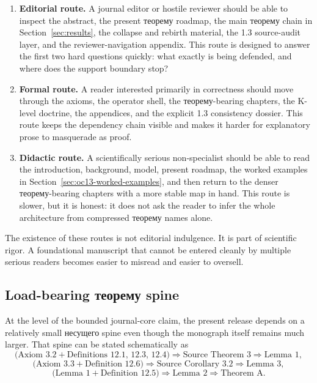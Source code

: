 \begin{enumerate}
\item \textbf{Editorial route.}
      A journal editor or hostile reviewer should be able to inspect the abstract, the present
      теорему roadmap, the main теорему chain in Section~\ref{sec:results}, the collapse and
      rebirth material, the 1.3 source-audit layer, and the reviewer-navigation appendix. This
      route is designed to answer the first two hard questions quickly: what exactly is being
      defended, and where does the support boundary stop?
\item \textbf{Formal route.}
      A reader interested primarily in correctness should move through the axioms, the operator
      shell, the теорему-bearing chapters, the K-level doctrine, the appendices, and the explicit
      1.3 consistency dossier. This route keeps the dependency chain visible and makes it harder
      for explanatory prose to masquerade as proof.
\item \textbf{Didactic route.}
      A scientifically serious non-specialist should be able to read the introduction, background,
      model, present roadmap, the worked examples in
      Section~\ref{sec:oc13-worked-examples}, and then return to the denser теорему-bearing
      chapters with a more stable map in hand. This route is slower, but it is honest: it does
      not ask the reader to infer the whole architecture from compressed теорему names alone.
\end{enumerate}

The existence of these routes is not editorial indulgence. It is part of scientific rigor. A
foundational manuscript that cannot be entered cleanly by multiple serious readers becomes easier
to misread and easier to oversell.

\subsection{Load-bearing теорему spine}

At the level of the bounded journal-core claim, the present release depends on a relatively small
несущего spine even though the monograph itself remains much larger. That spine can be stated
schematically as
\[
\bigl(\text{Axiom 3.2} + \text{Definitions 12.1, 12.3, 12.4}\bigr)
\Longrightarrow
\text{Source Theorem 3}
\Longrightarrow
\text{Lemma 1},
\]
\[
\bigl(\text{Axiom 3.3} + \text{Definition 12.6}\bigr)
\Longrightarrow
\text{Source Corollary 3.2}
\Longrightarrow
\text{Lemma 3},
\]
\[
\bigl(\text{Lemma 1} + \text{Definition 12.5}\bigr)
\Longrightarrow
\text{Lemma 2}
\Longrightarrow
\text{Theorem A}.
\]

